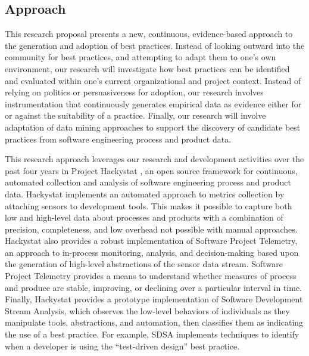 \subsection{Approach}

This research proposal presents a new, continuous, evidence-based approach
to the generation and adoption of best practices.  Instead of looking
outward into the community for best practices, and attempting to adapt them
to one's own environment, our research will investigate how best practices
can be identified and evaluated within one's current organizational and
project context.  Instead of relying on politics or persuasiveness for
adoption, our research involves instrumentation that continuously generates
empirical data as evidence either for or against the suitability of a
practice.  Finally, our research will involve adaptation of data mining
approaches to support the discovery of candidate best practices from
software engineering process and product data.

This research approach leverages our research and development activities
over the past four years in Project Hackystat \cite{Hackystat}, an open
source framework for continuous, automated collection and analysis of
software engineering process and product data.  Hackystat implements an
automated approach to metrics collection by attaching sensors to
development tools. This makes it possible to capture both low and
high-level data about processes and products with a combination of
precision, completeness, and low overhead not possible with manual
approaches. Hackystat also provides a robust implementation of Software
Project Telemetry, an approach to in-process monitoring, analysis, and
decision-making based upon the generation of high-level abstractions of the
sensor data stream.  Software Project Telemetry provides a means to
understand whether measures of process and produce are stable, improving,
or declining over a particular interval in time. Finally, Hackystat
provides a prototype implementation of Software Development Stream
Analysis, which observes the low-level behaviors of individuals as they
manipulate tools, abstractions, and automation, then classifies them as
indicating the use of a best practice.  For example, SDSA implements
techniques to identify when a developer is using the ``test-driven design''
best practice.

